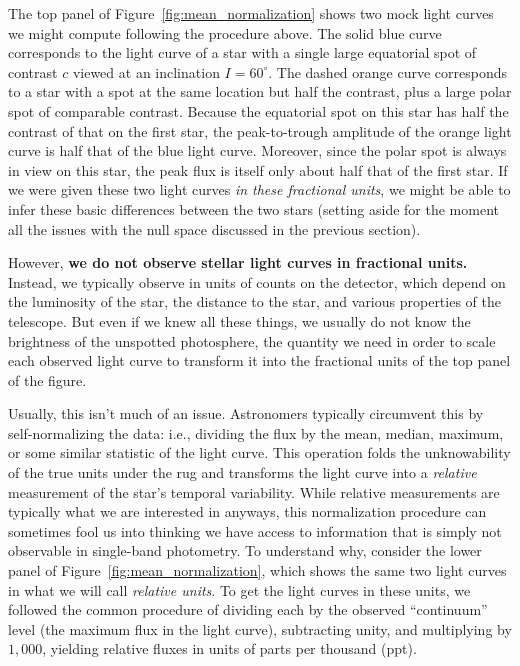 \documentclass[modern]{aastex62}
\begin{document}
The top panel of Figure~\ref{fig:mean_normalization} shows two mock
light curves we might compute following the procedure above. The solid blue
curve corresponds to the light curve of a star with a single large
equatorial spot of contrast $c$ viewed at an inclination $I = 60^\circ$.
The dashed orange curve corresponds to a star with a spot at the same
location but half the contrast, plus a large polar spot of comparable
contrast. Because the equatorial spot on this star has half the contrast of that on
the first star, the peak-to-trough amplitude of the orange light curve is half that of
the blue light curve. Moreover, since the polar spot is always in view on
this star, the peak flux is itself only about half that of the first star.
If we were given these two light curves \emph{in these fractional units},
we might be able to infer these basic differences between the two stars
(setting aside for the moment all the issues with the null space discussed
in the previous section).

However, \textbf{we do not observe stellar light curves in fractional units.}
Instead, we typically observe in units of counts on
the detector, which depend on the luminosity of the star, the distance to
the star, and various properties of the telescope. But even if we knew all these
things, we usually do not know the brightness of the unspotted
photosphere, the quantity we need in order to scale each observed light curve
to transform it into the fractional units of the top panel of the figure.

Usually, this isn't much of an issue. Astronomers typically circumvent
this by self-normalizing the data: i.e., dividing the flux by the mean,
median, maximum, or some similar statistic of the light curve.
%
This operation folds the unknowability of
the true units under the rug and transforms the light curve into a \emph{relative}
measurement of the star's temporal variability. While relative measurements
are typically what we are interested in anyways, this normalization procedure
can sometimes fool us into thinking we have access to information that
is simply not observable in single-band photometry. To understand why,
consider the lower panel of Figure~\ref{fig:mean_normalization}, which shows the
same two light curves in what we will call \emph{relative units}. To
get the light curves in these units, we followed the common procedure of
dividing each by the observed ``continuum'' level (the maximum flux in the
light curve), subtracting unity, and multiplying by $1{,}000$, yielding
relative fluxes in units of parts per thousand (ppt).
\end{document}
